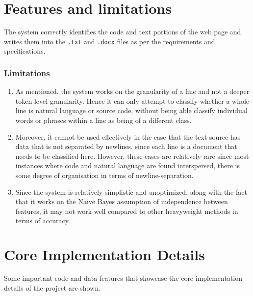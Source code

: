 \documentclass[12pt]{scrreprt}
\begin{document}



\section{Features and limitations}
The system correctly identifies the code and text portions of the web page and writes them into the \texttt{.txt} and \texttt{.docx} files as per the requirements and specifications. 

\subsubsection{Limitations}

\begin{enumerate}
    \item As mentioned, the system works on the granularity of a line and not a deeper token level granularity. Hence it can only attempt to classify whether a whole line is natural language or source code, without being able classify individual words or phrases within a line as being of a different class.
    \item Moreover, it cannot be used effectively in the case that the text source has data that is not separated by newlines, since each line is a document that needs to be classified here. However, these cases are relatively rare since most instances where code and natural language are found interspersed, there is some degree of organisation in terms of newline-separation.
    \item Since the system is relatively simplistic and unoptimized, along with the fact that it works on the Naive Bayes assumption of independence between features, it may not work well compared to other heavyweight methods in terms of accuracy. 
\end{enumerate}

\section{Core Implementation Details}

Some important code and data features that showcase the core implementation details of the project are shown.


\end{document}
